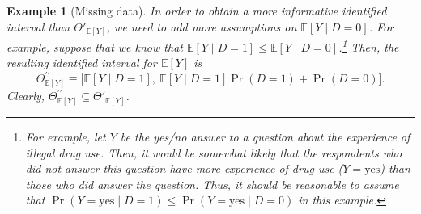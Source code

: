 \documentclass[10.5pt, A4paper, openany, uplatex]{book}
\newcommand{\E}{\mathbb{E}}
\newtheorem{example}[theorem]{Example}
\numberwithin{equation}{section}
\begin{document}
\begin{example}[Missing data]
	In order to obtain a more informative identified interval than $\Theta'_{\E[Y]}$, we need to add more assumptions on $\E [Y \mid D = 0]$.
	For example, suppose that we know that $\E [Y \mid D = 1] \le \E[Y \mid D = 0]$.\footnote{
		For example, let $Y$ be the yes/no answer to a question about the experience of illegal drug use.
		Then, it would be somewhat likely that the respondents who did not answer this question have more experience of drug use ($Y = \text{yes}$) than those who did answer the question.
		Thus, it should be reasonable to assume that $\Pr(Y = \text{yes} \mid D = 1) \le \Pr(Y = \text{yes} \mid D = 0)$ in this example.
	}
	Then, the resulting identified interval for $\E [Y ]$ is
	\[
	\Theta^{\prime\prime}_{\E[Y ]} \equiv \Big[ \E[Y \mid D = 1], \: \E[ Y \mid D = 1] \Pr(D = 1) + \Pr(D = 0) \Big].
	\]
	Clearly, $\Theta^{\prime\prime}_{\E[ Y ]} \subseteq \Theta'_{\E[ Y ]}$.
\end{example}
\end{document}
